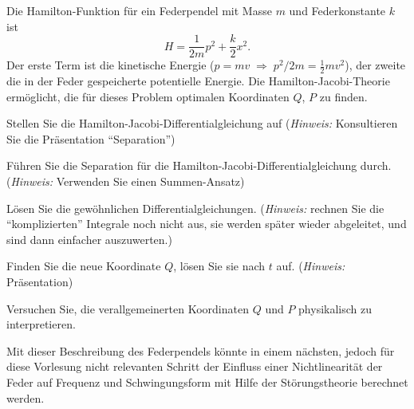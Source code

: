 Die Hamilton-Funktion für ein Federpendel mit Masse $m$ und Federkonstante $k$
ist
\[
H=\frac1{2m}p^2+\frac{k}2x^2.
\]
Der erste Term ist die kinetische Energie ($p=mv\;\Rightarrow\;p^2/2m=\frac12mv^2$),
der zweite die in der Feder gespeicherte potentielle Energie.
Die Hamilton-Jacobi-Theorie ermöglicht,
die für dieses Problem optimalen Koordinaten $Q$, $P$ zu finden.
\begin{teilaufgaben}
\item Stellen Sie die Hamilton-Jacobi-Differentialgleichung auf ({\it Hinweis:}
Konsultieren Sie die Präsentation ``Separation'')
\item Führen Sie die Separation für die Hamilton-Jacobi-Differentialgleichung
durch. ({\it Hinweis:} Verwenden Sie einen Summen-Ansatz)
\item Lösen Sie die gewöhnlichen Differentialgleichungen.
({\it Hinweis:} rechnen Sie
die ``komplizierten'' Integrale noch nicht aus, sie werden später wieder
abgeleitet, und sind dann einfacher auszuwerten.)
\item Finden Sie die neue Koordinate $Q$, lösen Sie sie nach $t$
auf. ({\it Hinweis:} Präsentation)
\item Versuchen Sie, die verallgemeinerten Koordinaten $Q$ und $P$ physikalisch
zu interpretieren.
\end{teilaufgaben}
Mit dieser Beschreibung des Federpendels könnte in einem nächsten, jedoch für
diese Vorlesung nicht relevanten Schritt der Einfluss einer Nichtlinearität
der Feder auf Frequenz und Schwingungsform mit Hilfe der Störungstheorie
berechnet werden.

